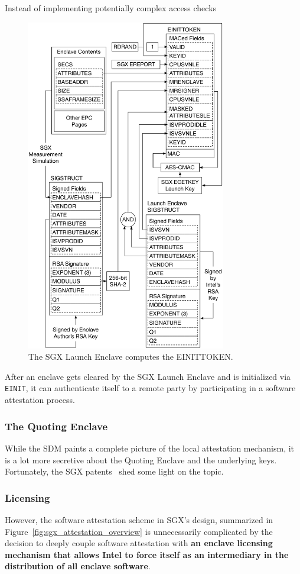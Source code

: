 Instead of implementing potentially complex access checks


\begin{figure}[hbt]
  \centering
  \includegraphics[width=87mm]{figures/sgx_einittoken.pdf}
  \caption{
    The SGX Launch Enclave computes the EINITTOKEN.
  }
  \label{fig:sgx_einittoken}
\end{figure}




After an enclave gets cleared by the SGX Launch Enclave and is initialized via
\texttt{EINIT}, it can authenticate itself to a remote party by participating
in a software attestation process.


\subsubsection{The Quoting Enclave}
\label{sec:sgx_quoting_enclave}

While the SDM paints a complete picture of the local attestation mechanism, it
is a lot more secretive about the Quoting Enclave and the underlying keys.
Fortunately, the SGX patents~\cite{intel2013patent1, intel2013patent2} shed
some light on the topic.



\subsubsection{Licensing}
\label{sec:sgx_licensing}

However, the software attestation scheme in SGX's design, summarized in
Figure~\ref{fig:sgx_attestation_overview} is unnecessarily complicated by the
decision to deeply couple software attestation with
\textbf{an enclave licensing mechanism that allows Intel to force itself as an
intermediary in the distribution of all enclave software}.
